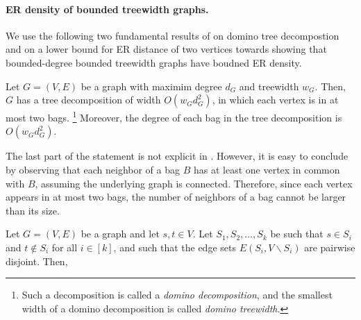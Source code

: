 \paragraph{ER density of bounded treewidth graphs.}
We use the following two fundamental results of \citet{journals/dmtcs/Bodlaender99} on domino tree decompostion and \citet{journals/mpcps/Nash-Williams59} on a lower bound for ER distance of two vertices towards showing that bounded-degree bounded treewidth graphs have boudned ER density.
\begin{lemma}
\label{lem:good_tree_decomp}
    Let $G=(V,E)$ be a graph with maximim degree $d_G$ and treewidth $w_G$.  Then, $G$ has a tree decomposition of width $O(w_G d_G^2)$, in which each vertex is in at most two bags.%
    \footnote{Such a decomposition is called a \emph{domino decomposition}, and the smallest width of a domino decomposition is called \emph{domino treewidth}.} Moreover, the degree of each bag in the tree decomposition is $O(w_G d_G^2)$.
\end{lemma}
    
The last part of the statement is not explicit in \citet{journals/dmtcs/Bodlaender99}.  However, it is easy to conclude by observing that each neighbor of a bag $B$ has at least one vertex in common with $B$, assuming the underlying graph is connected.  Therefore, since each vertex appears in at most two bags, the number of neighbors of a bag cannot be larger than its size.
\begin{lemma}
\label{lem:nash_williams}
    Let $G=(V, E)$ be a graph and let $s, t\in V$.
    Let $S_1, S_2, \ldots, S_k$ be such that $s\in S_i$ and $t\not\in S_i$ for all $i\in[k]$, and such that the edge sets $E(S_i, V\backslash S_i)$ are pairwise disjoint. Then,
\end{lemma}

